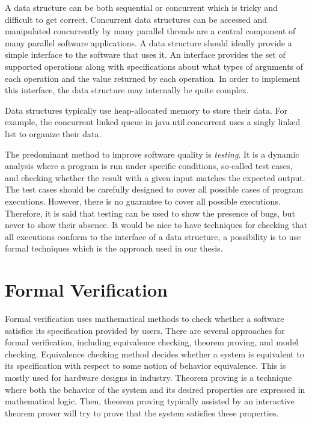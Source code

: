 A data structure can be both sequential or concurrent which is tricky and difficult to get correct. Concurrent data structures can be accessed and manipulated concurrently by many parallel threads are a central component of many parallel software applications. A data structure should ideally provide a simple interface to the software that uses it. An interface provides the set of supported operations along with specifications about what types of arguments of each operation and the value returned by each operation. In order to implement this interface, the data structure may internally be quite complex.

Data structures typically use heap-allocated memory to store their data. For example, the concurrent linked queue in java.util.concurrent uses a singly linked list to organize their data. 

The predominant method to improve software quality is
\emph{testing}. It is a dynamic analysis where a program is run under specific conditions, so-called test cases, and checking whether the result with a given input matches the expected output.
%
The test cases should be carefully designed to cover all possible cases of program executions.
However, there is no guarantee to cover all possible executions. Therefore, it is said that
testing can be used to show the presence of bugs, but never to show their absence. 
It would be nice to have techniques for checking that all executions conform to the interface of a data structure, a possibility is to use formal techniques which is the approach used in our thesis.

\section*{Formal Verification} 
Formal verification uses mathematical methods to check whether a software satisfies its specification provided by users. 
There are several approaches for formal verification, including equivalence checking, theorem proving, and model checking. Equivalence checking method decides whether a system is equivalent to its specification with respect to some notion of behavior equivalence. This is mostly used for hardware designs in industry. Theorem proving is a technique where both the behavior of the system and its desired properties are expressed in mathematical logic. Then, theorem proving typically assisted by an interactive theorem prover will try to prove that the system satisfies these properties. 

